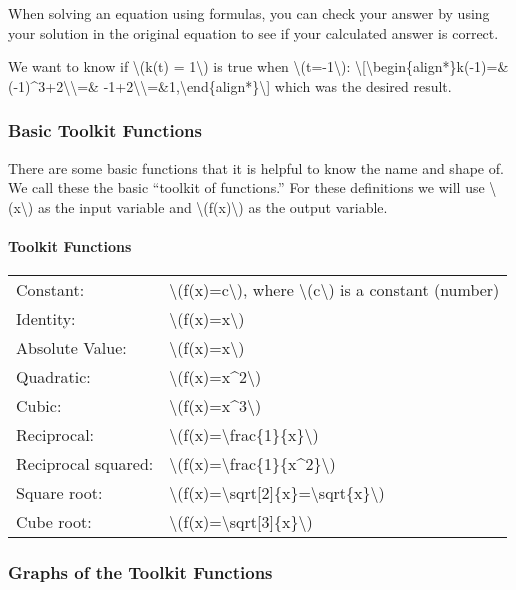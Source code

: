 When solving an equation using formulas, you can check your answer by
using your solution in the original equation to see if your calculated
answer is correct.

We want to know if \textbackslash{}(k(t) = 1\textbackslash{}) is true
when \textbackslash{}(t=-1\textbackslash{}):
\textbackslash{}{[}\textbackslash{}begin\{align*\}k(-1)=\&(-1)\^{}3+2\textbackslash{}\textbackslash{}=\&
-1+2\textbackslash{}\textbackslash{}=\&1,\textbackslash{}end\{align*\}\textbackslash{}{]}
which was the desired result.

\hypertarget{basic-toolkit-functions}{%
\subsubsection{Basic Toolkit Functions}\label{basic-toolkit-functions}}

There are some basic functions that it is helpful to know the name and
shape of. We call these the basic ``toolkit of functions.'' For these
definitions we will use \textbackslash{}(x\textbackslash{}) as the input
variable and \textbackslash{}(f(x)\textbackslash{}) as the output
variable.

\hypertarget{toolkit-functions}{%
\paragraph{Toolkit Functions}\label{toolkit-functions}}

\begin{longtable}[]{@{}ll@{}}
\toprule
\endhead
Constant: & \textbackslash{}(f(x)=c\textbackslash{}), where
\textbackslash{}(c\textbackslash{}) is a constant
(number)\tabularnewline
Identity: & \textbackslash{}(f(x)=x\textbackslash{})\tabularnewline
Absolute Value: &
\textbackslash{}(f(x)=\textbar{}x\textbar{}\textbackslash{})\tabularnewline
Quadratic: &
\textbackslash{}(f(x)=x\^{}2\textbackslash{})\tabularnewline
Cubic: & \textbackslash{}(f(x)=x\^{}3\textbackslash{})\tabularnewline
Reciprocal: &
\textbackslash{}(f(x)=\textbackslash{}frac\{1\}\{x\}\textbackslash{})\tabularnewline
Reciprocal squared: &
\textbackslash{}(f(x)=\textbackslash{}frac\{1\}\{x\^{}2\}\textbackslash{})\tabularnewline
Square root: &
\textbackslash{}(f(x)=\textbackslash{}sqrt{[}2{]}\{x\}=\textbackslash{}sqrt\{x\}\textbackslash{})\tabularnewline
Cube root: &
\textbackslash{}(f(x)=\textbackslash{}sqrt{[}3{]}\{x\}\textbackslash{})\tabularnewline
\bottomrule
\end{longtable}

\hypertarget{graphs-of-the-toolkit-functions}{%
\subsubsection{Graphs of the Toolkit
Functions}\label{graphs-of-the-toolkit-functions}}

